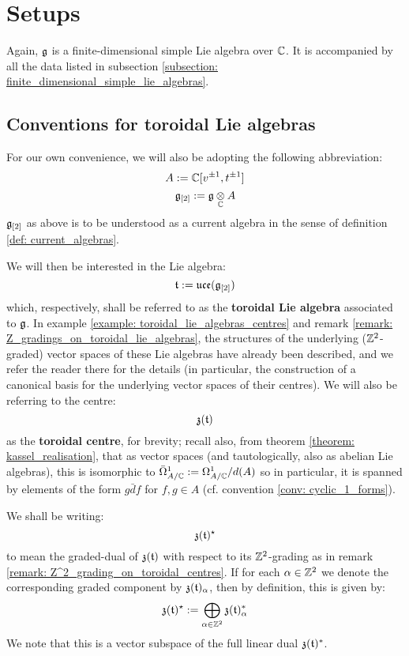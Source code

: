 \section{Setups}
    Again, $\mathfrak{g}$ is a finite-dimensional simple Lie algebra over $\mathbb{C}$. It is accompanied by all the data listed in subsection \ref{subsection: finite_dimensional_simple_lie_algebras}. 

    \subsection{Conventions for toroidal Lie algebras} \label{subsection: toroidal_lie_algebra_conventions}
        For our own convenience, we will also be adopting the following abbreviation:
            $$A := \mathbb{C}[v^{\pm 1}, t^{\pm 1}]$$
            $$\g_{[2]} := \g \tensor_{\bbC} A$$
        $\mathfrak{g}_{[2]}$ as above is to be understood as a current algebra in the sense of definition \ref{def: current_algebras}.
    
        We will then be interested in the Lie algebra:
            $$\mathfrak{t} := \mathfrak{uce}(\mathfrak{g}_{[2]})$$
        which, respectively, shall be referred to as the \textbf{toroidal Lie algebra} associated to $\mathfrak{g}$. In example \ref{example: toroidal_lie_algebras_centres} and remark \ref{remark: Z_gradings_on_toroidal_lie_algebras}, the structures of the underlying ($\mathbb{Z}^2$-graded) vector spaces of these Lie algebras have already been described, and we refer the reader there for the details (in particular, the construction of a canonical basis for the underlying vector spaces of their centres). We will also be referring to the centre:
            $$\mathfrak{z}(\mathfrak{t})$$
        as the \textbf{toroidal centre}, for brevity; recall also, from theorem \ref{theorem: kassel_realisation}, that as vector spaces (and tautologically, also as abelian Lie algebras), this is isomorphic to $\bar{\Omega}^1_{A/\mathbb{C}} := \Omega^1_{A/\mathbb{C}}/d(A)$ so in particular, it is spanned by elements of the form $g \bar{d}f$ for $f, g \in A$ (cf. convention \ref{conv: cyclic_1_forms}).

        We shall be writing:
            $$\mathfrak{z}(\mathfrak{t})^{\star}$$
        to mean the graded-dual of $\mathfrak{z}(\mathfrak{t})$ with respect to its $\mathbb{Z}^2$-grading as in remark \ref{remark: Z^2_grading_on_toroidal_centres}. If for each $\alpha \in \mathbb{Z}^2$ we denote the corresponding graded component by $\mathfrak{z}(\mathfrak{t})_{\alpha}$, then by definition, this is given by:
            $$\mathfrak{z}(\mathfrak{t})^{\star} := \bigoplus_{\alpha \in \mathbb{Z}^2} \mathfrak{z}(\mathfrak{t})_{\alpha}^*$$
        We note that this is a vector subspace of the full linear dual $\mathfrak{z}(\mathfrak{t})^*$.

